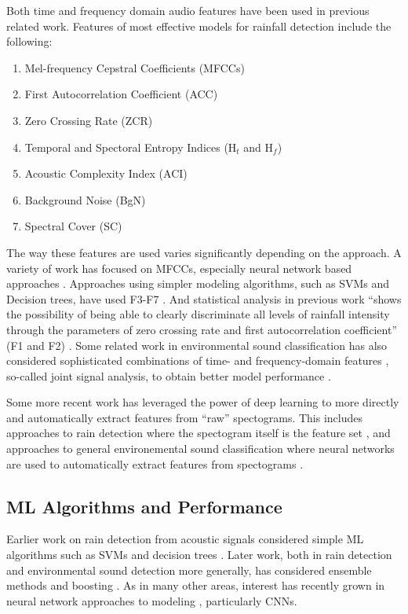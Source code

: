 Both time and frequency domain audio features have been used in
previous related work. Features of most effective models for rainfall
detection
\cite{Avanzato_et_al.,Avanzato_Fransesco_et_al.,quteprints82848}
include the following:
\begin{enumerate}[\hspace{5mm}F1.]
\item Mel-frequency Cepstral Coefficients (MFCCs)
\item First Autocorrelation Coefficient (ACC)
\item Zero Crossing Rate (ZCR)
\item Temporal and Spectoral Entropy Indices (H$_t$ and H$_f$)
\item Acoustic Complexity Index (ACI)
\item Background Noise (BgN)
\item Spectral Cover (SC)
\end{enumerate}
The way these features are used varies significantly depending on
the approach. 
A variety of work has focused on MFCCs, especially neural network
based approaches \cite{Avanzato_et_al.,Avanzato_Fransesco_et_al.}.
Approaches using simpler modeling algorithms, such as SVMs and
Decision trees, have used F3-F7 \cite{quteprints82848}. And statistical
analysis in previous work ``shows the possibility of being able to
clearly discriminate all levels of rainfall intensity through the
parameters of zero crossing rate and first autocorrelation
coefficient'' (F1 and F2) \cite{Avanzato_et_al.}. Some related work in
environmental sound classification has also considered sophisticated
combinations of time- and frequency-domain features , so-called joint
signal analysis, to obtain better model performance
\cite{electronics11223743}.

Some more recent work has leveraged the power of deep learning to more
directly and automatically extract features from ``raw''
spectograms. This includes approaches to rain detection where the
spectogram itself is the feature set \cite{Avanzato_et_al.}, and
approaches to general environemental sound classification where neural
networks are used to automatically extract features from spectograms
\cite{electronics11223743}.

\subsection{ML Algorithms and Performance}

Earlier work on rain detection from acoustic signals considered simple
ML algorithms such as SVMs and decision trees \cite{quteprints82848}.
Later work, both in rain detection and environmental sound detection
more generally, has considered ensemble methods and boosting
\cite{electronics11223743,s22093504}. As in many other areas,
interest has recently grown in neural network approaches to modeling
\cite{Avanzato_et_al.,Avanzato_Fransesco_et_al.,electronics11223743},
particularly CNNs.

